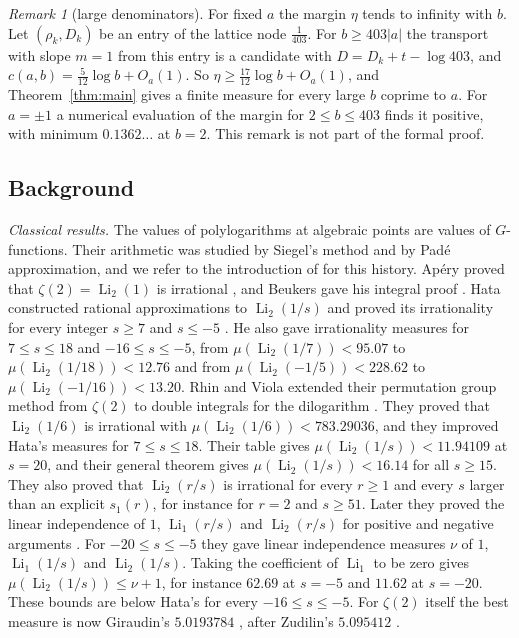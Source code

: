 \documentclass[11pt]{amsart}
\theoremstyle{definition}
\theoremstyle{remark}
\newtheorem{remark}[theorem]{Remark}
\numberwithin{equation}{section}
\newcommand{\Li}{\operatorname{Li}}
\begin{document}
\begin{remark}[large denominators]\label{rem:large}
For fixed $a$ the margin $\eta$ tends to infinity with $b$. Let $(\rho_k,D_k)$ be an entry of the lattice node
$\frac1{403}$. For $b\ge403|a|$ the transport with slope $m=1$ from this entry is a candidate with
$D=D_k+t-\log403$, and $c(a,b)=\frac5{12}\log b+O_a(1)$. So $\eta\ge\frac{17}{12}\log b+O_a(1)$, and
Theorem~\ref{thm:main} gives a finite measure for every large $b$ coprime to $a$. For $a=\pm1$ a numerical evaluation
of the margin for $2\le b\le403$ finds it positive, with minimum $0.1362\ldots$ at $b=2$. This remark is not part of
the formal proof.
\end{remark}

\subsection{Background}\label{ssec:background}
\emph{Classical results.} The values of polylogarithms at algebraic points are values of $G$-functions. Their
arithmetic was studied by Siegel's method and by Pad\'e approximation, and we refer to the introduction of
\cite{RhinViola05} for this history. Ap\'ery proved that $\zeta(2)=\Li_2(1)$ is irrational \cite{Apery79}, and Beukers
gave his integral proof \cite{Beukers79}. Hata constructed rational approximations to $\Li_2(1/s)$ and proved its
irrationality for every integer $s\ge7$ and $s\le-5$ \cite{Hata93dilog}. He also gave irrationality measures for
$7\le s\le18$ and $-16\le s\le-5$, from $\mu(\Li_2(1/7))<95.07$ to $\mu(\Li_2(1/18))<12.76$ and from
$\mu(\Li_2(-1/5))<228.62$ to $\mu(\Li_2(-1/16))<13.20$. Rhin and Viola extended their permutation group method from $\zeta(2)$
\cite{RhinViola96} to double integrals for the dilogarithm \cite{RhinViola05}. They proved that $\Li_2(1/6)$ is
irrational with $\mu(\Li_2(1/6))<783.29036$, and they improved Hata's measures for $7\le s\le18$. Their table gives
$\mu(\Li_2(1/s))<11.94109$ at $s=20$, and their general theorem gives $\mu(\Li_2(1/s))<16.14$ for all $s\ge15$. They
also proved that $\Li_2(r/s)$ is irrational for every $r\ge1$ and every $s$ larger than an explicit $s_1(r)$, for
instance for $r=2$ and $s\ge51$. Later they proved the linear independence of $1$, $\Li_1(r/s)$ and $\Li_2(r/s)$ for
positive and negative arguments \cite{RhinViola19}. For $-20\le s\le-5$ they gave linear independence measures $\nu$
of $1$, $\Li_1(1/s)$ and $\Li_2(1/s)$. Taking the coefficient of $\Li_1$ to be zero gives
$\mu(\Li_2(1/s))\le\nu+1$, for instance $62.69$ at $s=-5$ and $11.62$ at $s=-20$. These bounds are below Hata's for
every $-16\le s\le-5$. For $\zeta(2)$ itself the best measure is now Giraudin's $5.0193784$
\cite{Giraudin26}, after Zudilin's $5.095412$ \cite{Zudilin14}.
\end{document}

